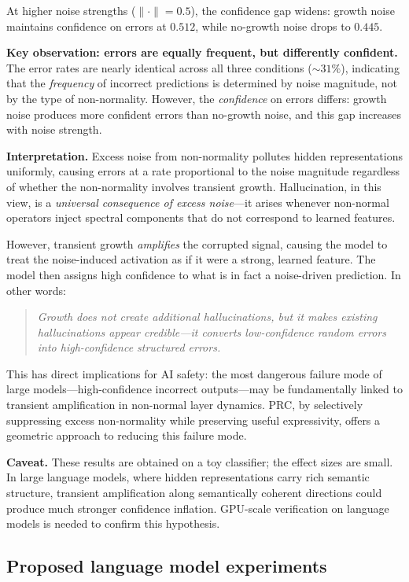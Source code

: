 \documentclass[11pt,a4paper]{article}
\theoremstyle{definition}
\begin{document}
At higher noise strengths ($\|\cdot\| = 0.5$), the confidence gap
widens: growth noise maintains confidence on errors at $0.512$,
while no-growth noise drops to $0.445$.

\textbf{Key observation: errors are equally frequent, but differently confident.}
The error rates are nearly identical across all three conditions
($\sim 31\%$), indicating that the \emph{frequency} of incorrect
predictions is determined by noise magnitude, not by the type of
non-normality. However, the \emph{confidence} on errors differs:
growth noise produces more confident errors than no-growth noise,
and this gap increases with noise strength.

\textbf{Interpretation.}
Excess noise from non-normality pollutes hidden representations
uniformly, causing errors at a rate proportional to the noise magnitude
regardless of whether the non-normality involves transient growth.
Hallucination, in this view, is a \emph{universal consequence of
excess noise}---it arises whenever non-normal operators inject
spectral components that do not correspond to learned features.

However, transient growth \emph{amplifies} the corrupted signal,
causing the model to treat the noise-induced activation as if it were
a strong, learned feature. The model then assigns high confidence to
what is in fact a noise-driven prediction. In other words:
\begin{quote}
\emph{Growth does not create additional hallucinations, but it makes
existing hallucinations appear credible---it converts low-confidence
random errors into high-confidence structured errors.}
\end{quote}

This has direct implications for AI safety: the most dangerous
failure mode of large models---high-confidence incorrect outputs---may
be fundamentally linked to transient amplification in non-normal
layer dynamics. PRC, by selectively suppressing excess non-normality
while preserving useful expressivity, offers a geometric approach to
reducing this failure mode.

\textbf{Caveat.}
These results are obtained on a toy classifier; the effect sizes are
small. In large language models, where hidden representations carry
rich semantic structure, transient amplification along semantically
coherent directions could produce much stronger confidence inflation.
GPU-scale verification on language models is needed to confirm this
hypothesis.

\subsection{Proposed language model experiments}
\end{document}
